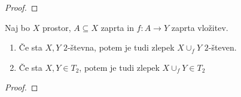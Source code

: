 \begin{proof}
    \todo{}
\end{proof}

\begin{trditev}
    Naj bo \(X\) prostor, \(A \subseteq X\) zaprta in \(f: A \to Y\) zaprta vložitev.
    \begin{enumerate}
        \item Če sta \(X, Y\) \(2\)-števna, potem je tudi zlepek \(X \cup_f Y\) \(2\)-števen.
        \item Če sta \(X, Y \in T_2\), potem je tudi zlepek  \(X \cup_f Y \in T_2\)
    \end{enumerate}
\end{trditev}

\begin{proof}
    \todo{}
\end{proof}